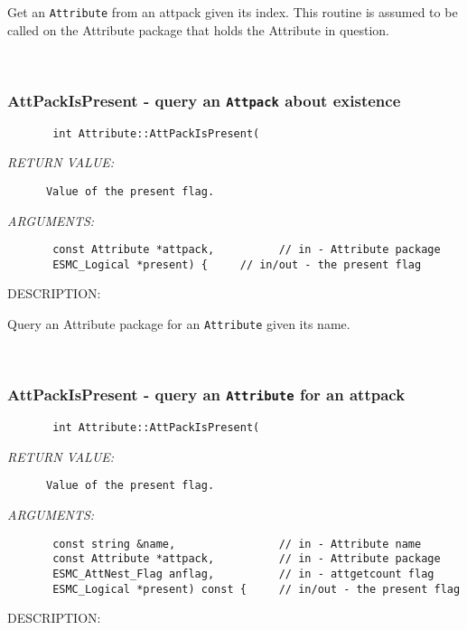        Get an {\tt Attribute} from an attpack given its index.
       This routine is assumed to be called on the
       Attribute package that holds the Attribute in question.
   
 
\mbox{}\hrulefill\
 
\subsubsection [AttPackIsPresent] {AttPackIsPresent - query an {\tt Attpack} about existence}


  
\begin{verbatim}       int Attribute::AttPackIsPresent(
   \end{verbatim}{\em RETURN VALUE:}
\begin{verbatim}      Value of the present flag.
   \end{verbatim}{\em ARGUMENTS:}
\begin{verbatim}       const Attribute *attpack,          // in - Attribute package
       ESMC_Logical *present) {     // in/out - the present flag
   \end{verbatim}
{\sf DESCRIPTION:\\ }


       Query an Attribute package for an {\tt Attribute} given its name.
   
 
\mbox{}\hrulefill\
 
\subsubsection [AttPackIsPresent] {AttPackIsPresent - query an {\tt Attribute} for an attpack}


  
\begin{verbatim}       int Attribute::AttPackIsPresent(\end{verbatim}{\em RETURN VALUE:}
\begin{verbatim}      Value of the present flag.\end{verbatim}{\em ARGUMENTS:}
\begin{verbatim}       const string &name,                // in - Attribute name
       const Attribute *attpack,          // in - Attribute package
       ESMC_AttNest_Flag anflag,          // in - attgetcount flag
       ESMC_Logical *present) const {     // in/out - the present flag\end{verbatim}
{\sf DESCRIPTION:\\ }


